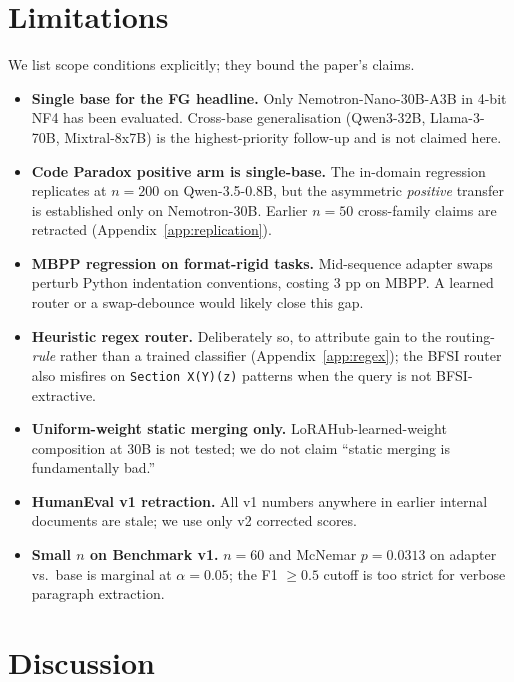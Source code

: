 \documentclass{article}
\begin{document}
\section{Limitations}
\label{sec:limitations}

We list scope conditions explicitly; they bound the paper's claims.
\begin{itemize}
\setlength{\itemsep}{1pt}
\item \textbf{Single base for the FG headline.} Only Nemotron-Nano-30B-A3B in 4-bit NF4 has been evaluated. Cross-base generalisation (Qwen3-32B, Llama-3-70B, Mixtral-8x7B) is the highest-priority follow-up and is not claimed here.
\item \textbf{Code Paradox positive arm is single-base.} The in-domain regression replicates at $n=200$ on Qwen-3.5-0.8B, but the asymmetric \emph{positive} transfer is established only on Nemotron-30B. Earlier $n=50$ cross-family claims are retracted (Appendix~\ref{app:replication}).
\item \textbf{MBPP regression on format-rigid tasks.} Mid-sequence adapter swaps perturb Python indentation conventions, costing 3 pp on MBPP. A learned router or a swap-debounce would likely close this gap.
\item \textbf{Heuristic regex router.} Deliberately so, to attribute gain to the routing-\emph{rule} rather than a trained classifier (Appendix~\ref{app:regex}); the BFSI router also misfires on \texttt{Section X(Y)(z)} patterns when the query is not BFSI-extractive.
\item \textbf{Uniform-weight static merging only.} LoRAHub-learned-weight composition at 30B is not tested; we do not claim ``static merging is fundamentally bad.''
\item \textbf{HumanEval v1 retraction.} All v1 numbers anywhere in earlier internal documents are stale; we use only v2 corrected scores.
\item \textbf{Small $n$ on Benchmark v1.} $n=60$ and McNemar $p = 0.0313$ on adapter vs.\ base is marginal at $\alpha = 0.05$; the F1 $\geq 0.5$ cutoff is too strict for verbose paragraph extraction.
\end{itemize}

\section{Discussion}
\end{document}
